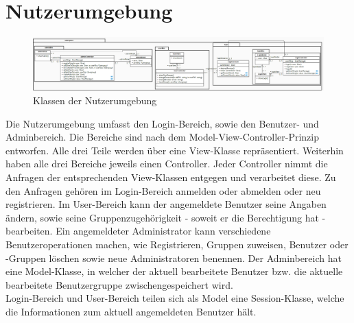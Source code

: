 \section{Nutzerumgebung}

\begin{figure}[h]
\includegraphics[width=1.0\linewidth]{Grafik/Klassendiagramme/Nutzerumgebung.png}
\caption{Klassen der Nutzerumgebung}
\end{figure}


Die Nutzerumgebung umfasst den Login-Bereich, sowie den Benutzer- und Adminbereich. Die Bereiche sind nach dem Model-View-Controller-Prinzip entworfen. Alle drei Teile werden über eine View-Klasse repräsentiert.
Weiterhin haben alle drei Bereiche jeweils einen Controller. Jeder Controller nimmt die Anfragen der entsprechenden View-Klassen entgegen und 
verarbeitet diese. Zu den Anfragen gehören im Login-Bereich anmelden oder abmelden oder neu registrieren.
Im User-Bereich kann der angemeldete Benutzer seine Angaben  ändern, sowie seine Gruppenzugehörigkeit  - soweit er die Berechtigung hat - bearbeiten.
Ein angemeldeter Administrator kann verschiedene Benutzeroperationen machen, wie Registrieren, Gruppen zuweisen, Benutzer oder -Gruppen löschen sowie  neue Administratoren benennen.
Der Adminbereich hat eine Model-Klasse, in welcher der aktuell bearbeitete Benutzer bzw. die aktuelle bearbeitete Benutzergruppe  zwischengespeichert wird.\\

\noindent Login-Bereich und User-Bereich teilen sich als Model eine Session-Klasse, welche die Informationen zum aktuell angemeldeten Benutzer hält.
